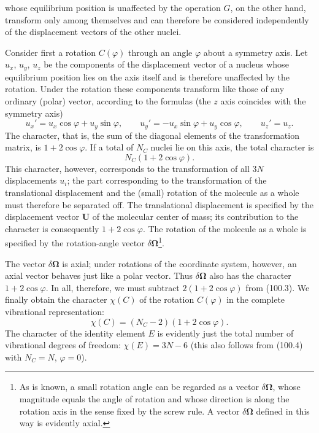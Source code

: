 whose equilibrium position is unaffected by the operation $G$, on the other hand, transform only among themselves and can therefore be considered independently of the displacement vectors of the other nuclei.

Consider first a rotation $C(\varphi)$ through an angle $\varphi$ about a symmetry axis. Let $u_x$, $u_y$, $u_z$ be the components of the displacement vector of a nucleus whose equilibrium position lies on the axis itself and is therefore unaffected by the rotation. Under the rotation these components transform like those of any ordinary (polar) vector, according to the formulas (the $z$ axis coincides with the symmetry axis)
\[
 u_x'=u_x\cos\varphi+u_y\sin\varphi,\qquad
 u_y'=-u_x\sin\varphi+u_y\cos\varphi,\qquad
 u_z'=u_z.
\]
The character, that is, the sum of the diagonal elements of the transformation matrix, is $1+2\cos\varphi$. If a total of $N_C$ nuclei lie on this axis, the total character is
\begin{equation}
 N_C(1+2\cos\varphi). \tag{100.3}
\end{equation}
This character, however, corresponds to the transformation of all $3N$ displacements $u_i$; the part corresponding to the transformation of the translational displacement and the (small) rotation of the molecule as a whole must therefore be separated off. The translational displacement is specified by the displacement vector $\mathbf U$ of the molecular center of mass; its contribution to the character is consequently $1+2\cos\varphi$. The rotation of the molecule as a whole is specified by the rotation-angle vector $\delta\boldsymbol\Omega$\footnote{As is known, a small rotation angle can be regarded as a vector $\delta\boldsymbol\Omega$, whose magnitude equals the angle of rotation and whose direction is along the rotation axis in the sense fixed by the screw rule. A vector $\delta\boldsymbol\Omega$ defined in this way is evidently axial.}.

The vector $\delta\boldsymbol\Omega$ is axial; under rotations of the coordinate system, however, an axial vector behaves just like a polar vector. Thus $\delta\boldsymbol\Omega$ also has the character $1+2\cos\varphi$. In all, therefore, we must subtract $2(1+2\cos\varphi)$ from (100.3). We finally obtain the character $\chi(C)$ of the rotation $C(\varphi)$ in the complete vibrational representation:
\begin{equation}
 \chi(C)=(N_C-2)(1+2\cos\varphi). \tag{100.4}
\end{equation}
The character of the identity element $E$ is evidently just the total number of vibrational degrees of freedom: $\chi(E)=3N-6$ (this also follows from (100.4) with $N_C=N$, $\varphi=0$).

